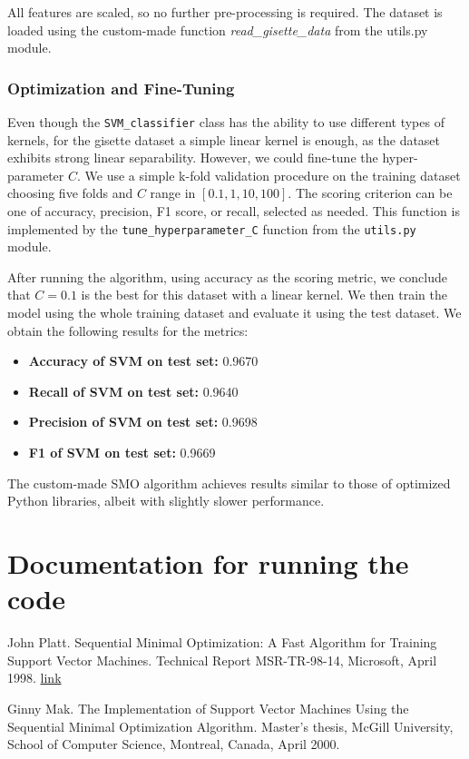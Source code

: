 \documentclass[10pt,a4paper]{article}
\newcounter{para}
\begin{document}
All features are scaled, so no further pre-processing is required. The dataset is loaded using the custom-made function \textit{read\_gisette\_data} from the utils.py module.


\subsubsection{Optimization and Fine-Tuning}

Even though the \texttt{SVM\_classifier} class has the ability to use different types of kernels, for the gisette dataset a simple linear kernel is enough, as the dataset exhibits strong linear separability. However, we could fine-tune the hyper-parameter \( C \). We use a simple k-fold validation procedure on the training dataset choosing five folds and \( C \) range in \([0.1, 1, 10, 100]\). The scoring criterion can be one of accuracy, precision, F1 score, or recall, selected as needed. This function is implemented by the \texttt{tune\_hyperparameter\_C} function from the \texttt{utils.py} module.

After running the algorithm, using accuracy as the scoring metric, we conclude that \( C=0.1 \) is the best for this dataset with a linear kernel. We then train the model using the whole training dataset and evaluate it using the test dataset. We obtain the following results for the metrics:

\begin{itemize}
	\item \textbf{Accuracy of SVM on test set:} 0.9670
	\item \textbf{Recall of SVM on test set:} 0.9640
	\item \textbf{Precision of SVM on test set:} 0.9698
	\item \textbf{F1 of SVM on test set:} 0.9669
\end{itemize}

The custom-made SMO algorithm achieves results similar to those of optimized Python libraries, albeit with slightly slower performance.

\section{Documentation for running the code}

 
\begin{thebibliography}{1}
	
	John Platt.
	\newblock Sequential Minimal Optimization: A Fast Algorithm for Training Support Vector Machines.
	\newblock Technical Report MSR-TR-98-14, Microsoft, April 1998.
	\newblock \href{https://www.microsoft.com/en-us/research/publication/sequential-minimal-optimization-a-fast-algorithm-for-training-support-vector-machines/}{link}
	
	Ginny Mak.
	\newblock The Implementation of Support Vector Machines Using the Sequential Minimal Optimization Algorithm.
	\newblock Master's thesis, McGill University, School of Computer Science, Montreal, Canada, April 2000.
	
\end{thebibliography}
\end{document}
